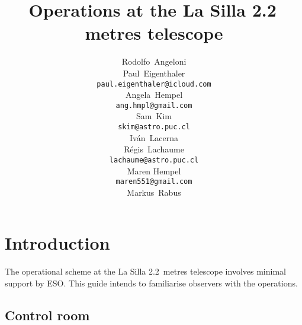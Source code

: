 \documentclass[11pt,fleqn,a4paper]{book}
\begin{document}
%
% 

\title{Operations at the La Silla 2.2\,metres telescope}%
\author{
    Rodolfo~Angeloni\\[5pt]
    Paul~Eigenthaler\\
    \texttt{paul.eigenthaler@icloud.com}\\[5pt]
    Angela~Hempel\\
    \texttt{ang.hmpl@gmail.com}\\[5pt]
    Sam~Kim\\
    \texttt{skim@astro.puc.cl}\\[5pt]
    Iv\'an~Lacerna\\[5pt]
    R\'egis~Lachaume\\
    \texttt{lachaume@astro.puc.cl}\\[5pt]
    Maren Hempel\\
    \texttt{maren551@gmail.com}\\[5pt]
    Markus~Rabus}%
%
\version{\today}
\maketitle

%
% 

\tableofcontents 
\cleardoublepage 

\listoffigures 
\cleardoublepage 

\listoftables
\cleardoublepage 

\listofprocedures
\cleardoublepage

%
%

\chapter{Introduction}
The operational scheme at the La Silla 2.2~metres telescope involves minimal support by ESO.  This guide intends to familiarise observers with the operations. 

\section{Control room}
\end{document}

